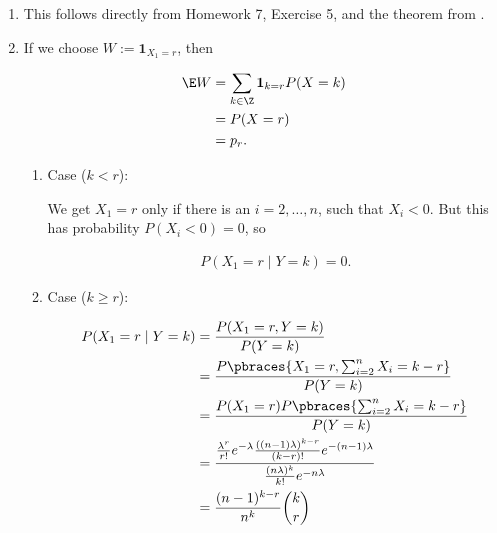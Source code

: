 \begin{solution}

\phantom{}

\begin{enumerate}[label = (\alph*)]

    \item This follows directly from Homework 7, Exercise 5, and the theorem from \cite[lecture, 8, slide 48]{EStat}.
    
    \item If we choose $W := \mathbf 1_{X_1 = r}$, then
    
    \begin{align*}
        \E W
        & =
        \sum_{k \in \Z}
            \mathbf 1_{k = r}
            P(X = k) \\
        & =
        P(X = r) \\
        & =
        p_r.
    \end{align*}

    \begin{enumerate}[label = \arabic*.]

        \item Case ($k < r$):

        We get $X_1 = r$ only if there is an $i = 2, \dots, n$, such that $X_i < 0$.
        But this has probability $P(X_i < 0) = 0$, so

        \begin{align*}
            P(X_1 = r \mid Y = k) = 0.
        \end{align*}

        \item Case ($k \geq r$):
        
        \begin{align*}
            P(X_1 = r \mid Y = k)
            & =
            \frac
            {
                P(X_1 = r, Y = k)
            }{
                P(Y = k)
            } \\
            & =
            \frac
            {
                P
                \pbraces
                {
                    X_1 = r,
                    \sum_{i=2}^n X_i = k - r
                }
            }{
                P(Y = k)
            } \\
            & =
            \frac
            {
                P(X_1 = r)
                P \pbraces{\sum_{i=2}^n X_i = k - r}
            }{
                P(Y = k)
            } \\
            & =
            \frac
            {
                \frac{\lambda^r}{r!} e^{-\lambda}
                \frac
                {
                    ((n - 1) \lambda)^{k - r}
                }{
                    (k - r)!
                }
                e^{-(n-1) \lambda}
            }{
                \frac{(n \lambda)^k}{k!} e^{-n \lambda}
            } \\
            & =
            \frac{(n - 1)^{k - r}}{n^k}
            \binom{k}{r}
        \end{align*}


\end{enumerate}
\end{enumerate}
\end{solution}
